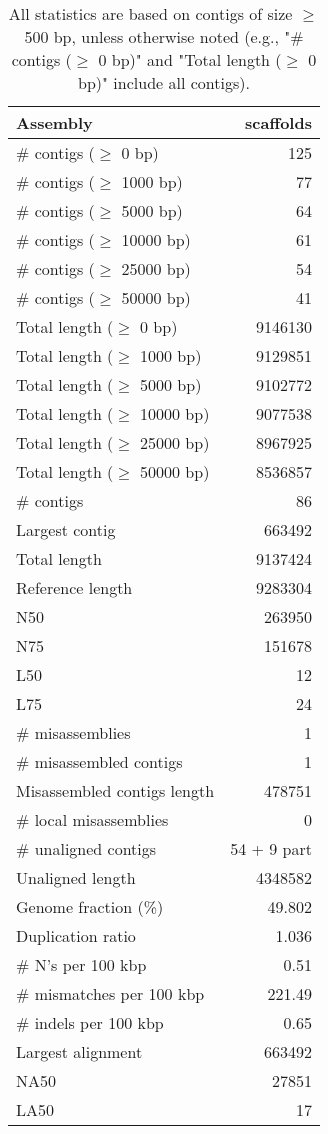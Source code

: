 \documentclass[12pt,a4paper]{article}
\begin{document}
\begin{table}[ht]
\begin{center}
\caption{All statistics are based on contigs of size $\geq$ 500 bp, unless otherwise noted (e.g., "\# contigs ($\geq$ 0 bp)" and "Total length ($\geq$ 0 bp)" include all contigs).}
\begin{tabular}{|l*{1}{|r}|}
\hline
Assembly & scaffolds \\ \hline
\# contigs ($\geq$ 0 bp) & 125 \\ \hline
\# contigs ($\geq$ 1000 bp) & 77 \\ \hline
\# contigs ($\geq$ 5000 bp) & 64 \\ \hline
\# contigs ($\geq$ 10000 bp) & 61 \\ \hline
\# contigs ($\geq$ 25000 bp) & 54 \\ \hline
\# contigs ($\geq$ 50000 bp) & 41 \\ \hline
Total length ($\geq$ 0 bp) & 9146130 \\ \hline
Total length ($\geq$ 1000 bp) & 9129851 \\ \hline
Total length ($\geq$ 5000 bp) & 9102772 \\ \hline
Total length ($\geq$ 10000 bp) & 9077538 \\ \hline
Total length ($\geq$ 25000 bp) & 8967925 \\ \hline
Total length ($\geq$ 50000 bp) & 8536857 \\ \hline
\# contigs & 86 \\ \hline
Largest contig & 663492 \\ \hline
Total length & 9137424 \\ \hline
Reference length & 9283304 \\ \hline
N50 & 263950 \\ \hline
N75 & 151678 \\ \hline
L50 & 12 \\ \hline
L75 & 24 \\ \hline
\# misassemblies & 1 \\ \hline
\# misassembled contigs & 1 \\ \hline
Misassembled contigs length & 478751 \\ \hline
\# local misassemblies & 0 \\ \hline
\# unaligned contigs & 54 + 9 part \\ \hline
Unaligned length & 4348582 \\ \hline
Genome fraction (\%) & 49.802 \\ \hline
Duplication ratio & 1.036 \\ \hline
\# N's per 100 kbp & 0.51 \\ \hline
\# mismatches per 100 kbp & 221.49 \\ \hline
\# indels per 100 kbp & 0.65 \\ \hline
Largest alignment & 663492 \\ \hline
NA50 & 27851 \\ \hline
LA50 & 17 \\ \hline
\end{tabular}
\end{center}
\end{table}
\end{document}
